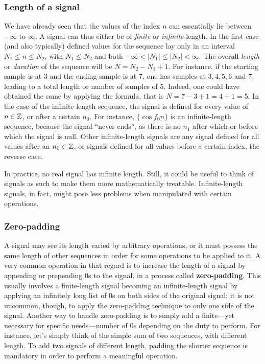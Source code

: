 \documentclass[\documentfontsize, twocolumn]{\classname}
\begin{document}
\subsubsection{Length of a signal}

We have already seen that the values of the index $n$ can essentially lie between $-\infty$ to $\infty$. A signal can thus either be of \emph{finite} or \emph{infinite}-length. In the first case (and also typically) defined values for the se\-quen\-ce lay only in an interval $N_1 \leq n \leq N_2$, with $N_1 \leq N_2$ and both $-\infty < |N_1| \leq |N_2| < \infty$. The overall \emph{length} or \emph{duration} of the se\-quen\-ce will be $N = N_2 - N_1 + 1$. For instance, if the starting sample is at $3$ and the ending sample is at $7$, one has samples at $3, 4, 5, 6$ and $7$, leading to a total length or number of samples of $5$. Indeed, one could have obtained the same by applying the formula, that is $N = 7 - 3 + 1 = 4 + 1 = 5$. In the case of the infinite length se\-quen\-ce, the signal is defined for every value of $n \in \mathbb Z$, or after a certain $n_0$. For instance, $\{\cos{f_0 n}\}$ is an infinite-length se\-quen\-ce, because the signal ``never ends'', as there is no $n_1$ after which or before which the signal is null. Other infinite-length signals are any signal defined for all values after an $n_0 \in \mathbb Z$, or signals defined for all values before a certain index, the reverse case.

In practice, no real signal has infinite length. Still, it could be useful to think of signals as such to make them more mathematically treatable. Infinite-length signals, in fact, might pose less problems when manipulated with certain operations.

\subsubsection{Zero-padding}

A signal may see its length varied by arbitrary operations, or it must possess the same length of other sequences in order for some operations to be applied to it. A very common operation in that regard is to increase the length of a signal by appending or prepending $0$s to the signal, in a process called \textbf{zero-padding}. This usually involves a finite-length signal becoming an infinite-length signal by applying an infinitely long list of $0$s on both sides of the original signal; it is not uncommon, though, to apply the zero-padding technique to only one side of the signal. Another way to handle zero-padding is to simply add a finite---yet necessary for specific needs---number of $0$s depending on the duty to perform. For instance, let's simply think of the simple sum of two sequences, with different length. To add two signals of different length, padding the shorter sequence is mandatory in order to perform a meaningful operation.
\end{document}
